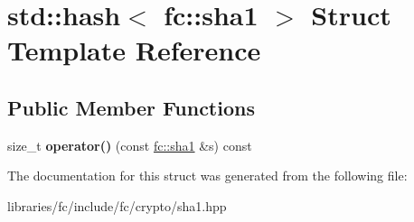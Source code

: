 \hypertarget{structstd_1_1hash_3_01fc_1_1sha1_01_4}{}\section{std\+:\+:hash$<$ fc\+:\+:sha1 $>$ Struct Template Reference}
\label{structstd_1_1hash_3_01fc_1_1sha1_01_4}
\subsection*{Public Member Functions}
\begin{DoxyCompactItemize}
\item 
\mbox{\label{structstd_1_1hash_3_01fc_1_1sha1_01_4_a0418ebf62d6c052f83dc517cbb0dfeba}} 
size\+\_\+t {\bfseries operator()} (const \mbox{\hyperlink{classfc_1_1sha1}{fc\+::sha1}} \&s) const
\end{DoxyCompactItemize}


The documentation for this struct was generated from the following file\+:\begin{DoxyCompactItemize}
\item 
libraries/fc/include/fc/crypto/sha1.\+hpp\end{DoxyCompactItemize}
